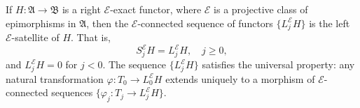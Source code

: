 If $H : \mathfrak{A} \to \mathfrak{B}$ is a right $\mathcal{E}$-exact functor, where $\mathcal{E}$ is a projective class of epimorphisms in $\mathfrak{A}$, then the $\mathcal{E}$-connected sequence of functors $\{L_j^{\mathcal{E}} H\}$ is the left $\mathcal{E}$-satellite of $H$. That is,
$$S_j^{\mathcal{E}} H = L_j^{\mathcal{E}} H, \quad j \ge 0,$$
and $L_j^{\mathcal{E}} H = 0$ for $j < 0$. The sequence $\{L_j^{\mathcal{E}} H\}$ satisfies the universal property: any natural transformation $\varphi : T_0 \to L_0^{\mathcal{E}} H$ extends uniquely to a morphism of $\mathcal{E}$-connected sequences $\{\varphi_j : T_j \to L_j^{\mathcal{E}} H\}$.